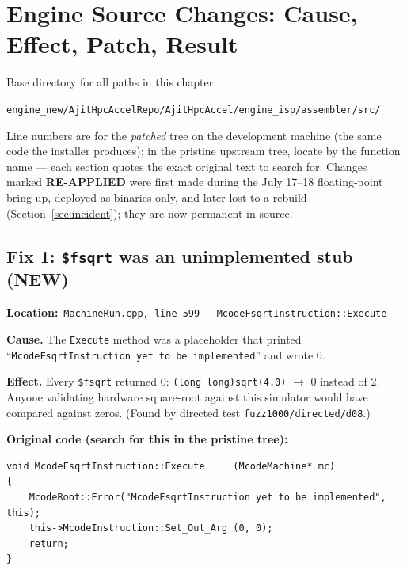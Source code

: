 \documentclass[11pt,a4paper]{report}
\newcommand{\filepath}[1]{\noindent\textbf{Location:}\ \texttt{#1}\par}
\begin{document}
\chapter{Engine Source Changes: Cause, Effect, Patch, Result}

Base directory for all paths in this chapter:

\begin{center}
\texttt{engine\_new/AjitHpcAccelRepo/AjitHpcAccel/engine\_isp/assembler/src/}
\end{center}

Line numbers are for the \emph{patched} tree on the development machine (the
same code the installer produces); in the pristine upstream tree, locate by
the function name --- each section quotes the exact original text to search
for. Changes marked \textbf{RE-APPLIED} were first made during the July
17--18 floating-point bring-up, deployed as binaries only, and later lost to
a rebuild (Section~\ref{sec:incident}); they are now permanent in source.

\section{Fix 1: \texttt{\$fsqrt} was an unimplemented stub (NEW)}

\filepath{MachineRun.cpp, line 599 --- McodeFsqrtInstruction::Execute}

\textbf{Cause.} The \texttt{Execute} method was a placeholder that printed
``\texttt{McodeFsqrtInstruction yet to be implemented}'' and wrote 0.

\textbf{Effect.} Every \texttt{\$fsqrt} returned 0:
\texttt{(long long)sqrt(4.0)} $\to$ 0 instead of 2. Anyone validating
hardware square-root against this simulator would have compared against
zeros. (Found by directed test \texttt{fuzz1000/directed/d08}.)

\textbf{Original code (search for this in the pristine tree):}
\begin{lstlisting}
void McodeFsqrtInstruction::Execute     (McodeMachine* mc)
{
    McodeRoot::Error("McodeFsqrtInstruction yet to be implemented", this);
    this->McodeInstruction::Set_Out_Arg (0, 0);
    return;
}
\end{lstlisting}
\end{document}
